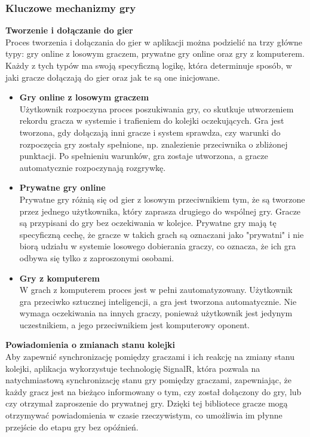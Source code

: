 \documentclass[twoside]{projektInzynierskiMS1}
\begin{document}
\newpage

\subsubsection{Kluczowe mechanizmy gry}

\noindent \textbf{Tworzenie i dołączanie do gier}\\
Proces tworzenia i dołączania do gier w aplikacji można podzielić na trzy główne typy: gry online z losowym graczem, prywatne gry online oraz gry z komputerem. Każdy z tych typów ma swoją specyficzną logikę, która determinuje sposób, w jaki gracze dołączają do gier oraz jak te są one inicjowane.

\begin{itemize}
    \item \textbf{Gry online z losowym graczem}\\
    Użytkownik rozpoczyna proces poszukiwania gry, co skutkuje utworzeniem rekordu gracza w systemie i trafieniem do kolejki oczekujących. Gra jest tworzona, gdy dołączają inni gracze i system sprawdza, czy warunki do rozpoczęcia gry zostały spełnione, np. znalezienie przeciwnika o zbliżonej punktacji. Po spełnieniu warunków, gra zostaje utworzona, a gracze automatycznie rozpoczynają rozgrywkę.
    
    \item \textbf{Prywatne gry online}\\
    Prywatne gry różnią się od gier z losowym przeciwnikiem tym, że są tworzone przez jednego użytkownika, który zaprasza drugiego do wspólnej gry. Gracze są przypisani do gry bez oczekiwania w kolejce. Prywatne gry mają tę specyficzną cechę, że gracze w takich grach są oznaczani jako "prywatni" i nie biorą udziału w systemie losowego dobierania graczy, co oznacza, że ich gra odbywa się tylko z zaproszonymi osobami.

    \item \textbf{Gry z komputerem}\\
    W grach z komputerem proces jest w pełni zautomatyzowany. Użytkownik gra przeciwko sztucznej inteligencji, a gra jest tworzona automatycznie. Nie wymaga oczekiwania na innych graczy, ponieważ użytkownik jest jedynym uczestnikiem, a jego przeciwnikiem jest komputerowy oponent.

\end{itemize}

\noindent \textbf{Powiadomienia o zmianach stanu kolejki}\\
Aby zapewnić synchronizację pomiędzy graczami i ich reakcję na zmiany stanu kolejki, aplikacja wykorzystuje technologię SignalR, która pozwala na natychmiastową synchronizację stanu gry pomiędzy graczami, zapewniając, że każdy gracz jest na bieżąco informowany o tym, czy został dołączony do gry, lub czy otrzymał zaproszenie do prywatnej gry. Dzięki tej bibliotece gracze mogą otrzymywać powiadomienia w czasie rzeczywistym, co umożliwia im płynne przejście do etapu gry bez opóźnień.
\end{document}
